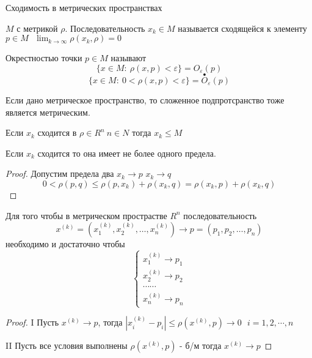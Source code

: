 \begin{title}[\Large]
  Сходимость в метрических пространствах
\end{title}

\begin{define}
  $M$ с метрикой $\rho$. Последовательность $x_k \in M$ называется сходящейся
  к элементу $p \in M ~~~ \lim_{k \to \infty} \rho(x_k, \rho) = 0$
\end{define}

\begin{define}
  Окрестностью точки $p \in M$ называют
  $$
  \{ x \in M: ~ \rho(x, p) < \varepsilon \} = O_{\varepsilon}(p)
  $$
  $$
  \{ x \in M: ~ 0 < \rho(x, p) < \varepsilon \} =
  \stackrel{\bullet}{O}_{\varepsilon}(p)
  $$
\end{define}

Если дано метрическое пространство, то сложенное подпротсранство тоже является
метрическим.

\begin{theorem}
  Если $x_k$ сходится в $\rho \in R^n ~ n \in N$ тогда $x_k \le M$
\end{theorem}

\begin{theorem}
  Если $x_k$ сходится то она имеет не более одного предела.
\end{theorem}

\begin{proof}
  Допустим предела два $x_k \to p$ $x_k \to q$
  $$
  0 < \rho(p, q) \le \rho(p, x_k) + \rho(x_k, q) = \rho(x_k, p) + \rho(x_k, q)
  $$
\end{proof}

\begin{theorem}
  Для того чтобы в метрическом прострастве $R^n$ последовательность
  $$
  x^{(k)} = (x_1^{(k)}, x_2^{(k)}, \ldots, x_n^{(k)}) \to
  p = (p_1, p_2, \ldots, p_n)
  $$
  необходимо и достаточно чтобы
  $$
  \left\{
  \begin{array}{c}
    x_1^{(k)} \to p_1 \\
    x_2^{(k)} \to p_2 \\
    \cdots \cdots \\
    x_n^{(k)} \to p_n
  \end{array}
  \right.
  $$
\end{theorem}

\begin{proof}
  I Пусть $x^{(k)} \to p$, тогда $|x_i^{(k)} - p_i| \le \rho(x^{(k)}, p) \to 0
  ~~~ i = 1, 2, \cdots, n$

  II Пусть все условия выполнены $\rho(x^{(k)}, p)$ - б/м тогда $x^{(k)} \to p$
\end{proof}

